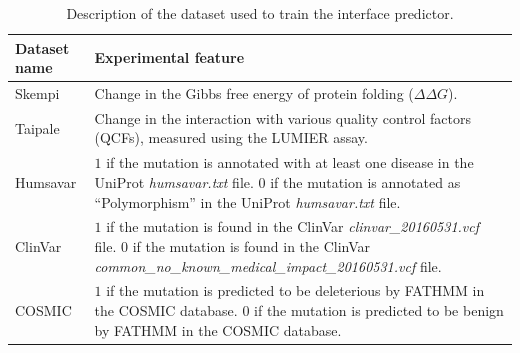 \begin{table}[ht]
\caption{Description of the dataset used to train the interface predictor.} \label{tab:interface_datasets}
\begin{tabular}{l | p{13cm}}
	\toprule
	Dataset name & Experimental feature \\
	\midrule
	Skempi \cite{kumar_protherm_2006} & Change in the Gibbs free energy of protein folding ($\Delta \Delta G$). \\
	Taipale \cite{sahni_widespread_2015} & Change in the interaction with various quality control factors (QCFs), measured using the LUMIER assay. \\
	Humsavar \cite{consortium_uniprot:_2015} & $1$ if the mutation is annotated with at least one disease in the UniProt \textit{humsavar.txt} file. $0$ if the mutation is annotated as ``Polymorphism'' in the UniProt \textit{humsavar.txt} file. \\
	ClinVar \cite{landrum_clinvar:_2016} & $1$ if the mutation is found in the ClinVar \textit{clinvar\_20160531.vcf} file. $0$ if the mutation is found in the ClinVar \textit{common\_no\_known\_medical\_impact\_20160531.vcf} file. \\
	COSMIC \cite{forbes_cosmic:_2015} & $1$ if the mutation is predicted to be deleterious by FATHMM in the COSMIC database. $0$ if the mutation is predicted to be benign by FATHMM in the COSMIC database. \\
	\bottomrule
\end{tabular}
\end{table}



